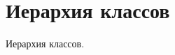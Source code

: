 \section{Иерархия классов}
Иерархия классов.\begin{DoxyCompactList}
\item {}
\item {}
\begin{DoxyCompactList}
\item {}
\item {}
\end{DoxyCompactList}
\end{DoxyCompactList}
